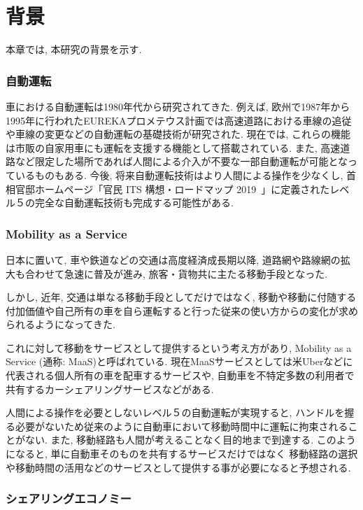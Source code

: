 \chapter{背景}
\label{background}



本章では, 本研究の背景を示す.

\subsection{自動運転}

車における自動運転は1980年代から研究されてきた.
例えば, 欧州で1987年から1995年に行われたEUREKAプロメテウス計画では高速道路における車線の追従や車線の変更などの自動運転の基礎技術が研究された.
現在では, これらの機能は市販の自家用車にも運転を支援する機能として搭載されている. また, 高速道路など限定した場所であれば人間による介入が不要な一部自動運転が可能となっているものもある.
今後, 将来自動運転技術はより人間による操作を少なくし, 首相官邸ホームページ「官民 ITS 構想・ロードマップ 2019~\cite{ITS}」に定義されたレベル５の完全な自動運転技術も完成する可能性がある.


\subsection{Mobility as a Service}

日本に置いて, 車や鉄道などの交通は高度経済成長期以降, 道路網や路線網の拡大も合わせて急速に普及が進み, 旅客・貨物共に主たる移動手段となった. 

しかし, 近年, 交通は単なる移動手段としてだけではなく, 移動や移動に付随する付加価値や自己所有の車を自ら運転すると行った従来の使い方からの変化が求められるようになってきた.

これに対して移動をサービスとして提供するという考え方があり, Mobility as a Service (通称: MaaS)と呼ばれている. 現在MaaSサービスとしては米Uberなどに代表される個人所有の車を配車するサービスや, 自動車を不特定多数の利用者で共有するカーシェアリングサービスなどがある.

人間による操作を必要としないレベル５の自動運転が実現すると, ハンドルを握る必要がないため従来のように自動車において移動時間中に運転に拘束されることがない.
また, 移動経路も人間が考えることなく目的地まで到達する. このようになると, 単に自動車そのものを共有するサービスだけではなく
移動経路の選択や移動時間の活用などのサービスとして提供する事が必要になると予想される.

\subsection{シェアリングエコノミー}

